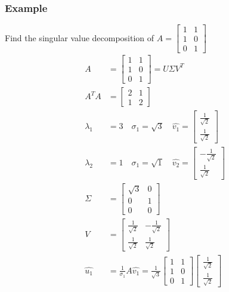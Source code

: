 \documentclass{math}
\begin{document}
\subsubsection*{Example}
Find the singular value decomposition of \( A = \begin{bmatrix}
  1 & 1 \\ 1 & 0 \\ 0 & 1\end{bmatrix} \)
\begin{align*}
  A &= \begin{bmatrix}
    1 & 1 \\
    1 & 0 \\
    0 & 1
  \end{bmatrix} = U\Sigma V^T \\
  A^TA &= \begin{bmatrix}
    2 & 1 \\
    1 & 2
  \end{bmatrix} \\
  \lambda_1 &= 3 \quad \sigma_1 = \sqrt{3} \quad \hat{v_1} = \begin{bmatrix}
    \frac{1}{\sqrt{2}} \\ \frac{1}{\sqrt{2}}
  \end{bmatrix} \\
  \lambda_2 &= 1 \quad \sigma_1 = \sqrt{1} \quad \hat{v_2} = \begin{bmatrix}
    -\frac{1}{\sqrt{2}} \\ \frac{1}{\sqrt{2}}
  \end{bmatrix} \\
  \Sigma &= \begin{bmatrix}
    \sqrt{3} & 0 \\
    0 & 1 \\
    0 & 0
  \end{bmatrix} \\
  V &= \begin{bmatrix}
    \frac{1}{\sqrt{2}} & -\frac{1}{\sqrt{2}} \\
    \frac{1}{\sqrt{2}} & \frac{1}{\sqrt{2}}
  \end{bmatrix} \\
  \hat{u_1} &= \frac{1}{\sigma_1}A\hat{v_1} = \frac{1}{\sqrt{3}}\begin{bmatrix}
    1 & 1 \\
    1 & 0 \\
    0 & 1
  \end{bmatrix}\begin{bmatrix}
    \frac{1}{\sqrt{2}} \\ \frac{1}{\sqrt{2}}

\end{bmatrix}
\end{align*}
\end{document}
